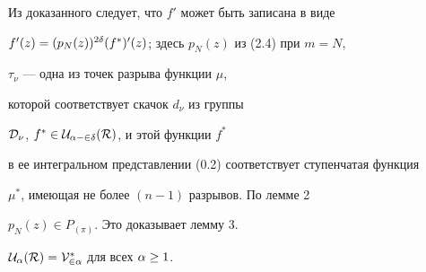 \begin{pf}
Из доказанного следует, что $f'$ может быть записана в виде


$f'(z)=(p_N(z))^{2\delta}(f^*)'(z)$; здесь $p_N(z)$ из (2.4) при $m=N$,


$\tau_{\nu}$ --- одна из точек разрыва функции $\mu$,


которой соответствует скачок $d_{\nu}$ из группы


$\cal D_{\nu}$, $f^* \in \cal U_{\alpha-2\delta}(R)$, и этой функции $f^*$


в ее интегральном представлении (0.2) соответствует ступенчатая функция


$\mu^*$, имеющая не более $(n-1)$ разрывов. По лемме 2


$ p_N(z) \in P_{(\pi)}$.  Это доказывает лемму 3.


\end{pf}





\begin{thm}


$\cal U_\alpha(R)=V_{2\alpha}^*$ для всех $\alpha\ge1$.


\end{thm}





